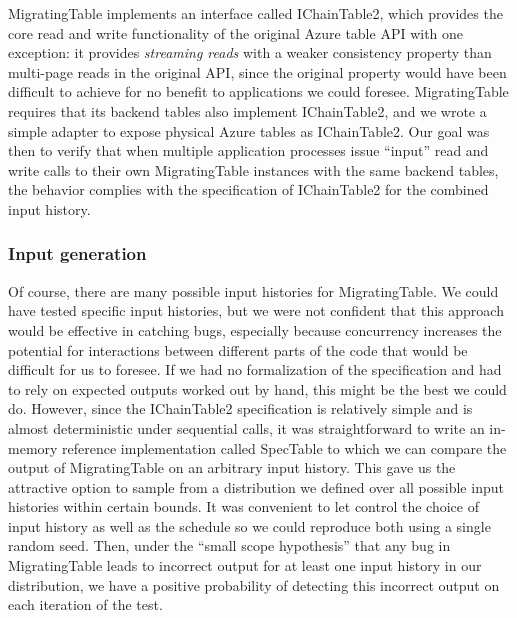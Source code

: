 
MigratingTable implements an interface called IChainTable2, which provides the core read and write functionality of the original Azure table API with one exception: it provides \emph{streaming reads} with a weaker consistency property than multi-page reads in the original API, since the original property would have been difficult to achieve for no benefit to applications we could foresee.  MigratingTable requires that its backend tables also implement IChainTable2, and we wrote a simple adapter to expose physical Azure tables as IChainTable2.  Our goal was then to verify that when multiple application processes issue ``input'' read and write calls to their own MigratingTable instances with the same backend tables, the behavior complies with the specification of IChainTable2 for the combined input history.

\subsubsection{Input generation}
\label{sec:mtable:input}

Of course, there are many possible input histories for MigratingTable.  We could have tested specific input histories, but we were not confident that this approach would be effective in catching bugs, especially because concurrency increases the potential for interactions between different parts of the code that would be difficult for us to foresee.  If we had no formalization of the specification and had to rely on expected outputs worked out by hand, this might be the best we could do.  However, since the IChainTable2 specification is relatively simple and is almost deterministic under sequential calls, it was straightforward to write an in-memory reference implementation called SpecTable to which we can compare the output of MigratingTable on an arbitrary input history.  This gave us the attractive option to sample from a distribution we defined over all possible input histories within certain bounds.  It was convenient to let \psharp control the choice of input history as well as the schedule so we could reproduce both using a single random seed.  Then, under the ``small scope hypothesis'' that any bug in MigratingTable leads to incorrect output for at least one input history in our distribution, we have a positive probability of detecting this incorrect output on each iteration of the \psharp test.

